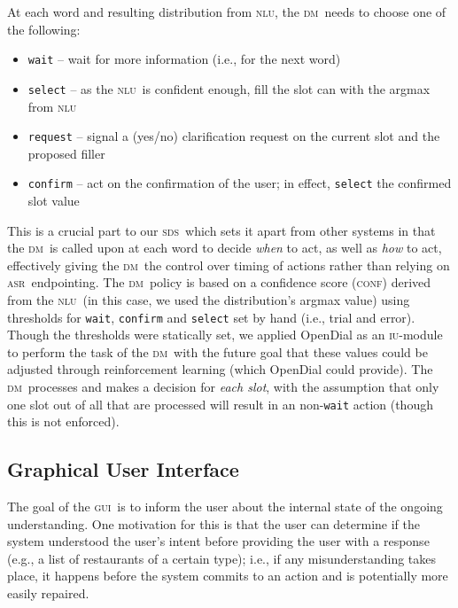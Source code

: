 \documentclass[11pt]{article}
\newcommand{\sds}[0]{\textsc{sds}}
\newcommand{\nlu}[0]{\textsc{nlu}}
\newcommand{\asr}[0]{\textsc{asr}}
\newcommand{\dm}[0]{\textsc{dm}}
\newcommand{\ui}[0]{\textsc{gui}}
\newcommand{\iu}[0]{\textsc{iu}}
\newcommand{\conf}[0]{\textsc{conf}}
\begin{document}
At each word and resulting distribution from \nlu, the \dm\ needs to choose one of the following:
\begin{itemize}
 \item \texttt{wait} -- wait for more information (i.e., for the next word) %
 \item \texttt{select} -- as the \nlu\ is confident enough, fill the slot can with the argmax from \nlu %
 \item \texttt{request} -- signal a (yes/no) clarification request on the current slot and the proposed filler%
 \item \texttt{confirm} -- act on the confirmation of the user; in effect, \texttt{select} the confirmed slot value%
\end{itemize}

This is a crucial part to our \sds\ which sets it apart from other systems in that the \dm\ is called upon at each word to decide \emph{when} to act, as well as \emph{how} to act, effectively giving the \dm\ the control over timing of actions rather than relying on \asr\ endpointing. The \dm\ policy is based on a confidence score (\conf) derived from the \nlu\ (in this case, we used the distribution's argmax value) using thresholds for \texttt{wait}, \texttt{confirm} and \texttt{select} set by hand (i.e., trial and error). Though the thresholds were statically set, we applied OpenDial \cite{Lison2015a} as an \iu-module to perform the task of the \dm\ with the future goal that these values could be adjusted through reinforcement learning (which OpenDial could provide). The \dm\ processes and makes a decision for \emph{each slot}, with the assumption that only one slot out of all that are processed will result in an non-\texttt{wait} action (though this is not enforced). 

\subsection{Graphical User Interface}
\label{section:display}

The goal of the \ui\ is to inform the user about the internal state of the ongoing understanding. One motivation for this is that the user can determine if the system understood the user's intent before providing the user with a response (e.g., a list of restaurants of a certain type); i.e., if any misunderstanding takes place, it happens before the system commits to an action and is potentially more easily repaired. 
\end{document}
